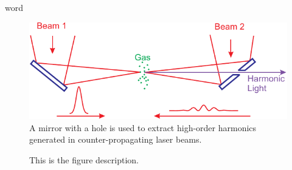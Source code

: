 \documentclass[oneside, astronomy, noacknowlegments]{BYUPhys}
\begin{document}
word
\cite{RefWorks:doc:58929816e4b0499fa95c51a6}
\cite{RefWorks:doc:58929629e4b0d4c09201f6b8}
\cite{RefWorks:doc:589299f4e4b0d4c09201f915}
\cite{RefWorks:doc:58929128e4b0228a292928a7}
\cite{RefWorks:doc:589299fbe4b0dec22aee3bd8}
\cite{RefWorks:doc:5892912ae4b0dec22aee3993}
\cite{RefWorks:doc:58929128e4b0499fa95c5064}
\cite{RefWorks:doc:5892989ee4b0499fa95c51c8}
\cite{RefWorks:doc:589293f5e4b0dec22aee39de}
\cite{RefWorks:doc:589295fce4b0d4c09201f6b4}
\cite{RefWorks:doc:58929a02e4b0d4c09201f91b}
\cite{RefWorks:doc:589295bde4b0d4c09201f692}
\cite{RefWorks:doc:58929264e4b0d4c09201f63b}
\cite{RefWorks:doc:58929129e4b0d4c09201f61e}
\cite{RefWorks:doc:58929602e4b0d4c09201f6b6}
\cite{RefWorks:doc:589296c6e4b0d4c09201f6f5}
\cite{RefWorks:doc:58929746e4b0dec22aee3a9a}
\cite{RefWorks:doc:589297a9e4b0d4c09201f736}
\cite{RefWorks:doc:58929800e4b0499fa95c51a1}
\cite{RefWorks:doc:589299f0e4b0dec22aee3bd6}
\cite{RefWorks:doc:58929786e4b0228a292929b8}
\cite{RefWorks:doc:58929612e4b0499fa95c50fa}
\cite{RefWorks:doc:5892964ee4b0499fa95c5108}
\cite{RefWorks:doc:58929c15e4b0228a29292c58}
\cite{RefWorks:doc:5892912ae4b0228a292928aa}

\begin{figure}
    \centerline{\includegraphics{Graphic1}}
    \caption[Setup for using counter-propagating light]{\label{fig:MirrorDiagram}
     A mirror with a hole is used to extract high-order harmonics generated in
     counter-propagating laser beams.}
\end{figure}

\begin{figure}
    \caption[SiC energy levels and zero-field splitting]{\label{fig:SiCZeeman}
     This is the figure description.}
 \end{figure}







\printindex
\end{document}
